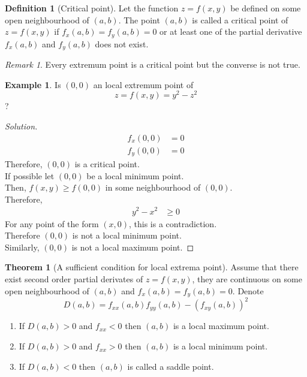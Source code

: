 \documentclass[fleqn, a4paper, 12pt]{article}
\theoremstyle{definition}
\newtheorem{example}{Example}
\newtheorem{definition}{Definition}
\theoremstyle{theorem}
\newtheorem{theorem}{Theorem}
\theoremstyle{remark}
\newtheorem{remark}{Remark}
\newenvironment{solution}
{\begin{proof}[Solution]\let\qed\relax}
	{\end{proof}}
\begin{document}
\begin{definition}[Critical point]
	Let the function $z = f(x, y)$ be defined on some open neighbourhood of $(a, b)$. The point $(a, b)$ is called a critical point of $z = f(x, y)$ if $f_x(a, b) = f_y(a, b) = 0$ or at least one of the partial derivative $f_x(a, b)$ and $f_y(a, b)$ does not exist.
\end{definition}

\begin{remark}
	Every extremum point is a critical point but the converse is not true.
\end{remark}

\begin{example}
	Is $(0,0)$ an local extremum point of
	\begin{equation*}
		z = f(x, y) = y^2 - z^2
	\end{equation*}
	?
\end{example}
\begin{solution}
	\begin{align*}
		f_x(0,0) &= 0\\
		f_y(0,0) &= 0
	\end{align*}
	Therefore, $(0,0)$ is a critical point.\\
	If possible let $(0,0)$ be a local minimum point.\\
	Then, $f(x,y) \geq f(0,0)$ in some neighbourhood of $(0,0)$.\\
	Therefore,
	\begin{align*}
		y^2 - x^2 &\geq 0
	\end{align*}
	For any point of the form $(x, 0)$, this is a contradiction.\\
	Therefore $(0,0)$ is not a local minimum point.\\
	Similarly, $(0,0)$ is not a local maximum point.
\end{solution}

\begin{theorem}[A sufficient condition for local extrema point]
	Assume that there exist second order partial derivates of $z = f(x,y)$, they are continuous on some open neighbourhood of $(a,b)$ and $f_x(a,b) =f_y(a,b) = 0$. Denote 
	\begin{equation*}
		D(a, b) = f_{xx}(a,b) f_{yy}(a,b) - \left( f_{xy}(a,b) \right)^2
	\end{equation*}
	\begin{enumerate}
		\item If $D(a,b) > 0$ and $f_{xx} < 0$ then $(a,b)$ is a local maximum point.
		\item If $D(a,b) > 0$ and $f_{xx} > 0$ then $(a,b)$ is a local minimum point.
		\item If $D(a,b) < 0$ then $(a,b)$ is called a saddle point.
	\end{enumerate}
\end{theorem}
\end{document}
